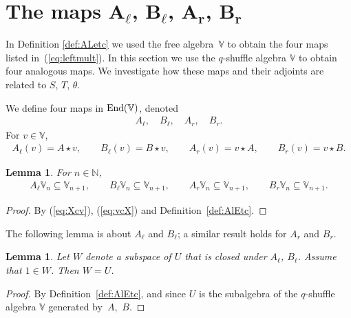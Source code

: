 \documentclass[pdftex]{sigma}
\numberwithin{equation}{section}
\newtheorem{Lemma}[Theorem]{Lemma}
\begin{document}
\section[The maps $A_{\ell}$, $B_{\ell}$, $A_{r}$, $B_{r}$]{The maps $\boldsymbol{A_{\ell}}$, $\boldsymbol{B_{\ell}}$, $\boldsymbol{A_{r}}$, $\boldsymbol{B_{r}}$}\label{section7}

In Definition \ref{def:ALetc} we used the free algebra~$\mathbb V$ to obtain the four maps listed in~(\ref{eq:leftmult}). In this section we use the $q$-shuffle algebra $\mathbb V$ to obtain
four analogous maps. We investigate how these maps and their adjoints are related to $S$, $T$, $\theta$.

\begin{Definition}\label{def:AlEtc}We define four maps in ${\rm End}(\mathbb V)$, denoted
\begin{gather}\label{eq:alblarbr}
A_{\ell}, \quad
B_{\ell}, \quad
A_{r}, \quad
B_{r}.
\end{gather}
For $v \in \mathbb V$,
\begin{gather*}
A_{\ell}(v) = A\star v, \qquad
B_{\ell}(v) = B\star v, \qquad
A_{r}(v) = v \star A, \qquad
B_{r}(v) = v \star B.
\end{gather*}
\end{Definition}

\begin{Lemma}\label{lem:ABlRaise2} For $n \in \mathbb N$,
\begin{gather*}
A_{\ell} \mathbb V_n \subseteq \mathbb V_{n+1},
\qquad
B_{\ell} \mathbb V_n \subseteq \mathbb V_{n+1},
\qquad
A_{r} \mathbb V_n \subseteq \mathbb V_{n+1},
\qquad
B_{r} \mathbb V_n \subseteq \mathbb V_{n+1}.
\end{gather*}
\end{Lemma}
\begin{proof} By (\ref{eq:Xcv}), (\ref{eq:vcX}) and Definition~\ref{def:AlEtc}.
\end{proof}

The following lemma is about $A_\ell$ and $B_{\ell}$; a similar result holds for
 $A_r$ and $B_r$.
\begin{Lemma}\label{lem:ABirred2} Let $W$ denote a subspace of $U$ that is closed under $A_\ell$, $B_{\ell}$. Assume that $1 \in W$. Then $W=U$.
\end{Lemma}
\begin{proof} By Definition~\ref{def:AlEtc}, and since $U$ is the subalgebra of the $q$-shuffle algebra $\mathbb V$ generated by~$A$,~$B$.
\end{proof}
\end{document}
